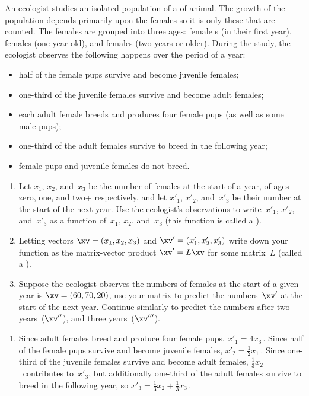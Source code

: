 \begin{example} \label{eg:matasp}
An ecologist studies an isolated population of a  of animal.
The growth of the population depends primarily upon the females so it is only these that are counted.
The females are grouped into three ages: female s (in their first year),  females (one year old), and  females (two years or older).
During the study, the ecologist observes the following happens over the period of a year:
\begin{itemize}
\item  half of the female pups survive and become juvenile females;
\item  one-third of the juvenile females survive and become adult females;
\item  each adult female breeds and produces four female pups (as well as some male pups);
\item  one-third of the adult females survive to breed in the following year;
\item  female pups and juvenile females do not breed.
\end{itemize}
\begin{enumerate}
\item Let \(x_1\), \(x_2\), and~\(x_3\) be the number of females at the start of a year, of ages zero, one, and two+ respectively, and let \(x'_1\), \(x'_2\), and~\(x'_3\) be their number at the start of the next year.
Use the ecologist's observations to write~\(x'_1\), \(x'_2\), and~\(x'_3\) as a function of~\(x_1\), \(x_2\), and~\(x_3\)  (this function is called a ).
\item Letting vectors \(\xv=(x_1,x_2,x_3)\) and \(\xv'=(x'_1,x'_2,x'_3)\) write down your function as the matrix-vector product \(\xv'=L\xv\) for some matrix~\(L\) (called a ).
\item Suppose the ecologist observes the numbers of females at the start of a given year is \(\xv=(60,70,20)\), use your matrix to predict the numbers~\(\xv'\) at the start of the next year.  
Continue similarly to predict the numbers after two years~(\(\xv''\)), and three years~(\(\xv'''\)).
\end{enumerate}

\begin{solution} 
\begin{enumerate}
\item Since adult females breed and produce four female pups, \(x'_1=4x_3\)\,.
Since half of the female pups survive and become juvenile females, \(x'_2=\frac12x_1\)\,.
Since one-third of the juvenile females survive and become adult females, \(\frac13x_2\)~contributes to~\(x'_3\), but additionally one-third of the adult females survive to breed in the following year, so  \(x'_3=\frac13x_2+\frac13x_3\)\,.


\end{enumerate}
\end{solution}
\end{example}
